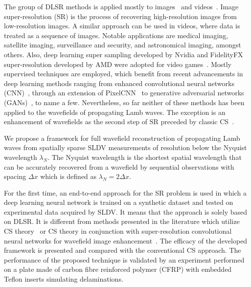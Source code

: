 The group of DLSR methods is applied mostly to images~\cite{Dahl2017,Zhang2018,Wang2019} and videos~\cite{Zhang2017,Yan2019}.
Image super-resolution (SR) is the process of recovering high-resolution images from low-resolution images.
A similar approach can be used in videos, where data is treated as a sequence of images.
Notable applications are medical imaging, satellite imaging, surveillance and security, and astronomical imaging, amongst others.
Also, deep learning super sampling developed by Nvidia and FidelityFX super-resolution developed by AMD were adopted for video games~\cite{Claypool2006}.
Mostly supervised techniques are employed, which benefit from recent advancements in deep learning methods ranging from enhanced convolutional neural networks (CNN)~\cite{Zhang2017}, through an extension of PixelCNN~\cite{Dahl2017} to generative adversarial networks (GANs)~\cite{Wang2019}, to name a few.
Nevertheless, so far neither of these methods has been applied to the wavefields of propagating Lamb waves.
The exception is an enhancement of wavefields as the second step of SR preceded by classic CS~\cite{Park2017a,KeshmiriEsfandabadi2020}.

We propose a framework for full wavefield reconstruction of propagating Lamb waves from spatially sparse SLDV measurements of resolution below the Nyquist wavelength $\lambda_N$. 
The Nyquist wavelength is the shortest spatial wavelength that can be accurately recovered from a wavefield by sequential observations with spacing $\Delta x$ which is defined as $\lambda_N = 2 \Delta x$. 

For the first time, an end-to-end approach for the SR problem is used in which a deep learning neural network is trained on a synthetic dataset and tested on experimental data acquired by SLDV.
It means that the approach is solely based on DLSR.
It is different from methods presented in the literature which utilize CS theory~\cite{Harley2013, KeshmiriEsfandabadi2018} or CS theory in conjunction with super-resolution convolutional neural networks for wavefield image enhancement~\cite{Park2017a, KeshmiriEsfandabadi2020}.
The efficacy of the developed framework is presented and compared with the conventional CS approach.
The performance of the proposed technique is validated by an experiment performed on a plate made of carbon fibre reinforced polymer (CFRP) with embedded Teflon inserts simulating delaminations.
